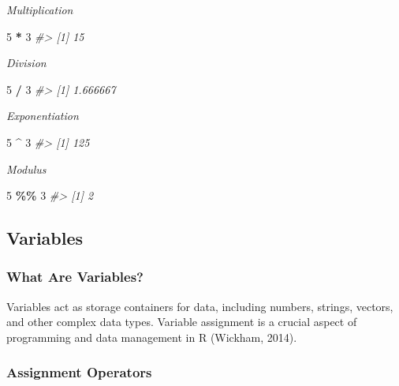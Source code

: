 \documentclass[
]{book}
\newenvironment{Shaded}{\begin{snugshade}}{\end{snugshade}}
\newcommand{\CommentTok}[1]{\textcolor[rgb]{0.56,0.35,0.01}{\textit{#1}}}
\newcommand{\DecValTok}[1]{\textcolor[rgb]{0.00,0.00,0.81}{#1}}
\newcommand{\SpecialCharTok}[1]{\textcolor[rgb]{0.81,0.36,0.00}{\textbf{#1}}}
\begin{document}
\emph{Multiplication}

\begin{Shaded}
\begin{Highlighting}[]
\DecValTok{5} \SpecialCharTok{*} \DecValTok{3}
\CommentTok{\#\textgreater{} [1] 15}
\end{Highlighting}
\end{Shaded}

\emph{Division}

\begin{Shaded}
\begin{Highlighting}[]
\DecValTok{5} \SpecialCharTok{/} \DecValTok{3}
\CommentTok{\#\textgreater{} [1] 1.666667}
\end{Highlighting}
\end{Shaded}

\emph{Exponentiation}

\begin{Shaded}
\begin{Highlighting}[]
\DecValTok{5} \SpecialCharTok{\^{}} \DecValTok{3}
\CommentTok{\#\textgreater{} [1] 125}
\end{Highlighting}
\end{Shaded}

\emph{Modulus}

\begin{Shaded}
\begin{Highlighting}[]
\DecValTok{5} \SpecialCharTok{\%\%} \DecValTok{3}
\CommentTok{\#\textgreater{} [1] 2}
\end{Highlighting}
\end{Shaded}

\hypertarget{variables}{%
\subsection*{Variables}\label{variables}}

\hypertarget{what-are-variables}{%
\subsubsection*{What Are Variables?}\label{what-are-variables}}

Variables act as storage containers for data, including numbers, strings, vectors, and other complex data types. Variable assignment is a crucial aspect of programming and data management in R (Wickham, 2014).

\hypertarget{assignment-operators}{%
\subsubsection*{Assignment Operators}\label{assignment-operators}}
\end{document}
